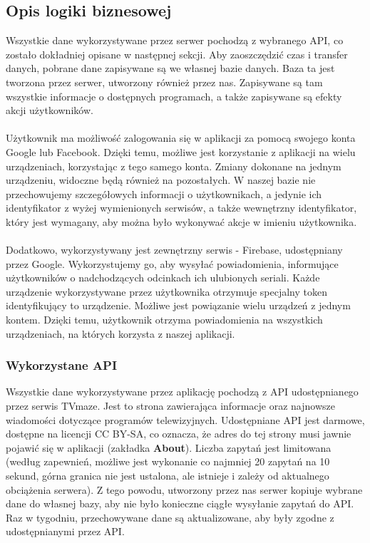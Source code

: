 \documentclass[10pt,a4paper]{article}
\begin{document}
\subsection{Opis logiki biznesowej}
Wszystkie dane wykorzystywane przez serwer pochodzą z wybranego API, co zostało dokładniej opisane w następnej sekcji. Aby zaoszczędzić czas i transfer danych, pobrane dane zapisywane są we własnej bazie danych. Baza ta jest tworzona przez serwer, utworzony również przez nas. Zapisywane są tam wszystkie informacje o dostępnych programach, a także zapisywane są efekty akcji użytkowników. \\~\\
Użytkownik ma możliwość zalogowania się w aplikacji za pomocą swojego konta Google lub Facebook. Dzięki temu, możliwe jest korzystanie z aplikacji na wielu urządzeniach, korzystając z tego samego konta. Zmiany dokonane na jednym urządzeniu, widoczne będą również na pozostałych. W naszej bazie nie przechowujemy szczegółowych informacji o użytkownikach, a jedynie ich identyfikator z wyżej wymienionych serwisów, a także wewnętrzny identyfikator, który jest wymagany, aby można było wykonywać akcje w imieniu użytkownika. \\~\\
Dodatkowo, wykorzystywany jest zewnętrzny serwis - Firebase, udostępniany przez Google. Wykorzystujemy go, aby wysyłać powiadomienia, informujące użytkowników o nadchodzących odcinkach ich ulubionych seriali. Każde urządzenie wykorzystywane przez użytkownika otrzymuje specjalny token identyfikujący to urządzenie. Możliwe jest powiązanie wielu urządzeń z jednym kontem. Dzięki temu, użytkownik otrzyma powiadomienia na wszystkich urządzeniach, na których korzysta z naszej aplikacji.

\subsubsection{Wykorzystane API}
Wszystkie dane wykorzystywane przez aplikację pochodzą z API udostępnianego przez serwis TVmaze. Jest to strona zawierająca informacje oraz najnowsze wiadomości dotyczące programów telewizyjnych. Udostępniane API jest darmowe, dostępne na licencji CC BY-SA, co oznacza, że adres do tej strony musi jawnie pojawić się w aplikacji (zakładka \textbf{About}). Liczba zapytań jest limitowana (według zapewnień, możliwe jest wykonanie co najmniej 20 zapytań na 10 sekund, górna granica nie jest ustalona, ale istnieje i zależy od aktualnego obciążenia serwera). Z tego powodu, utworzony przez nas serwer kopiuje wybrane dane do własnej bazy, aby nie było konieczne ciągłe wysyłanie zapytań do API. Raz w tygodniu, przechowywane dane są aktualizowane, aby były zgodne z udostępnianymi przez API.
\end{document}
